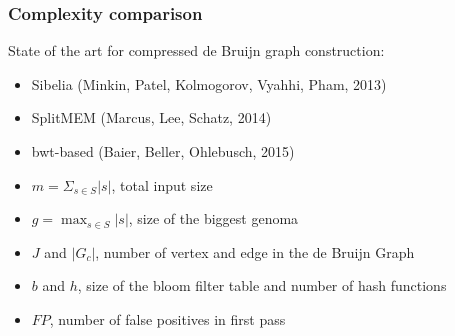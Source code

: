 \begin{frame}
	\frametitle{Complexity comparison}
	
	\centering
	
	
  State of the art for compressed de Bruijn graph construction:
  
	  \begin{itemize}
	    \item Sibelia (Minkin, Patel, Kolmogorov, Vyahhi, Pham, 2013)
	    \item SplitMEM (Marcus, Lee, Schatz, 2014)
	    \item bwt-based (Baier, Beller, Ohlebusch, 2015)
	  \end{itemize}

	
	  \medskip
	  
        
    \medskip

	
    \begin{itemize}
      \item $m = \Sigma_{s \in S}{ |s| }$, total input size
      \item $g = \max_{s \in S}{ |s| }$, size of the biggest genoma
      \item $J$ and $|G_{c}|$, number of vertex and edge in the de Bruijn Graph
      \item $b$ and $h$, size of the bloom filter table and number of hash functions
      \item $FP$, number of false positives in first pass
    \end{itemize}
    

\end{frame}


